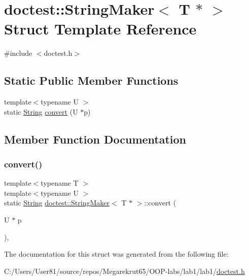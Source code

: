 \hypertarget{structdoctest_1_1_string_maker_3_01_t_01_5_01_4}{}\section{doctest\+:\+:String\+Maker$<$ T $\ast$ $>$ Struct Template Reference}
\label{structdoctest_1_1_string_maker_3_01_t_01_5_01_4}


{\ttfamily \#include $<$doctest.\+h$>$}

\subsection*{Static Public Member Functions}
\begin{DoxyCompactItemize}
\item 
{\footnotesize template$<$typename U $>$ }\\static \mbox{\hyperlink{classdoctest_1_1_string}{String}} \mbox{\hyperlink{structdoctest_1_1_string_maker_3_01_t_01_5_01_4_a79dfd2e72f48a1d9941b924d6ac23104}{convert}} (U $\ast$p)
\end{DoxyCompactItemize}


\subsection{Member Function Documentation}
\mbox{\label{structdoctest_1_1_string_maker_3_01_t_01_5_01_4_a79dfd2e72f48a1d9941b924d6ac23104}} 
\subsubsection{\texorpdfstring{convert()}{convert()}}
{\footnotesize\ttfamily template$<$typename T $>$ \\
template$<$typename U $>$ \\
static \mbox{\hyperlink{classdoctest_1_1_string}{String}} \mbox{\hyperlink{structdoctest_1_1_string_maker}{doctest\+::\+String\+Maker}}$<$ T $\ast$ $>$\+::convert (\begin{DoxyParamCaption}\item[{U $\ast$}]{p }\end{DoxyParamCaption})\hspace{0.3cm}{\ttfamily [inline]}, {\ttfamily [static]}}



The documentation for this struct was generated from the following file\+:\begin{DoxyCompactItemize}
\item 
C\+:/\+Users/\+User81/source/repos/\+Megarekrut65/\+O\+O\+P-\/labs/lab1/lab1/\mbox{\hyperlink{doctest_8h}{doctest.\+h}}\end{DoxyCompactItemize}
